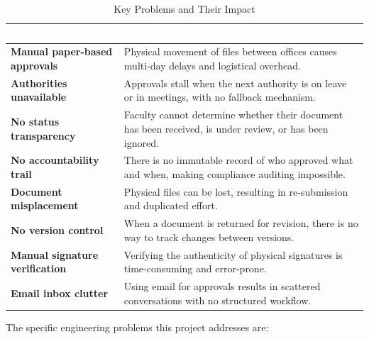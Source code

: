 \documentclass[12pt,a4paper]{report}
\newcommand{\citeref}[1]{%
  \textcolor{citeborder}{%
    \fboxsep=2pt%
    \fcolorbox{citeborder}{citebg}{\footnotesize\bfseries[#1]}%
  }%
}
\begin{document}
\renewcommand{\arraystretch}{1.4}
\begin{table}[H]
\centering
\caption{Key Problems and Their Impact}
\begin{tabularx}{\textwidth}{|>{\bfseries}p{4.2cm}|X|}
\hline
\rowcolor{headerblue}
\textcolor{white}{\textbf{Problem}} & \textcolor{white}{\textbf{Impact on Faculty \& Administration}} \\
\hline
\rowcolor{rowgray}
Manual paper-based approvals & Physical movement of files between offices causes multi-day delays and logistical overhead. \\
\hline
Authorities unavailable & Approvals stall when the next authority is on leave or in meetings, with no fallback mechanism. \\
\hline
\rowcolor{rowgray}
No status transparency & Faculty cannot determine whether their document has been received, is under review, or has been ignored. \\
\hline
No accountability trail \citeref{1} & There is no immutable record of who approved what and when, making compliance auditing impossible. \\
\hline
\rowcolor{rowgray}
Document misplacement & Physical files can be lost, resulting in re-submission and duplicated effort. \\
\hline
No version control & When a document is returned for revision, there is no way to track changes between versions. \\
\hline
\rowcolor{rowgray}
Manual signature verification & Verifying the authenticity of physical signatures is time-consuming and error-prone. \\
\hline
Email inbox clutter & Using email for approvals results in scattered conversations with no structured workflow. \\
\hline
\end{tabularx}
\end{table}

The specific engineering problems this project addresses are:
\end{document}
